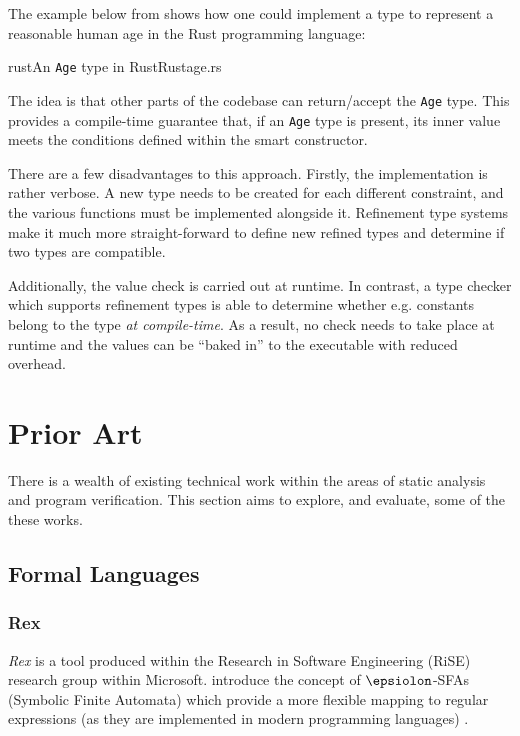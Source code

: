 \documentclass[a4paper,openany,12pt]{book}
\begin{document}
The example below from \citet{jkcclemens} shows how one could implement a type to represent a reasonable human age in
the Rust programming language:

\begin{mycodefile}{rust}{An \texttt{Age} type in Rust}{Rust}{age.rs}
\end{mycodefile}

The idea is that other parts of the codebase can return/accept the \texttt{Age} type.
This provides a compile-time guarantee that, if an \texttt{Age} type is present, its inner value meets the conditions
defined within the smart constructor.

There are a few disadvantages to this approach.
Firstly, the implementation is rather verbose.
A new type needs to be created for each different constraint, and the various functions must be implemented alongside
it.
Refinement type systems make it much more straight-forward to define new refined types and determine if two types are
compatible.

Additionally, the value check is carried out at runtime.
In contrast, a type checker which supports refinement types is able to determine whether e.g. constants belong to the
type \emph{at compile-time}.
As a result, no check needs to take place at runtime and the values can be ``baked in'' to the executable with
reduced overhead.

\section{Prior Art}

There is a wealth of existing technical work within the areas of static analysis and program verification.
This section aims to explore, and evaluate, some of the these works.

\subsection{Formal Languages}

\subsubsection{Rex}

\emph{Rex} is a tool produced within the Research in Software Engineering (RiSE) research group within Microsoft.
\citeauthor{rex} introduce the concept of $\epsiolon$-SFAs (Symbolic Finite Automata) which provide a more flexible
mapping to regular expressions (as they are implemented in modern programming languages) \citep{rex}.
\end{document}

